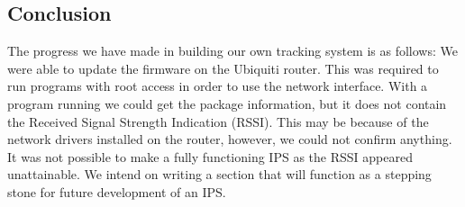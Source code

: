 \subsection*{Conclusion}
The progress we have made in building our own tracking system is as follows: We were able to update the firmware on the Ubiquiti router. This was required to run programs with root access in order to use the network interface. With a program running we could get the package information, but it does not contain the Received Signal Strength Indication (RSSI). This may be because of the network drivers installed on the router, however, we could not confirm anything. It was not possible to make a fully functioning IPS as the RSSI appeared unattainable. We intend on writing a section that will function as a stepping stone for future development of an IPS. 